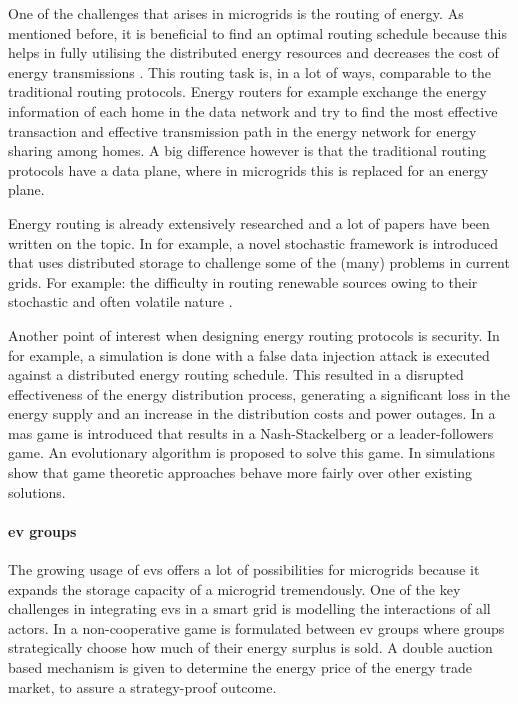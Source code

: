 One of the challenges that arises in microgrids is the routing of energy. As mentioned before, it is beneficial to find an optimal routing schedule because this helps in fully utilising the distributed energy resources and decreases the cost of energy transmissions \cite{HongKim2016}. This routing task is, in a lot of ways, comparable to the traditional routing protocols. Energy routers for example exchange the energy information of each home in the data network and try to find the most effective transaction and effective transmission path in the energy network for energy sharing among homes\cite{YoonKimChang2013}. A big difference however is that the traditional routing protocols have a data plane, where in microgrids this is replaced for an energy plane.

Energy routing is already extensively researched and a lot of papers have been written on the topic. In \cite{BaghaieMoellerKrishnamachari2010} for example, a novel stochastic framework is introduced that uses distributed storage to challenge some of the (many) problems in current grids. For example: the difficulty in routing renewable sources owing to their stochastic and often volatile nature \cite{HongKim2016}. 

Another point of interest when designing energy routing protocols is security. In \cite{LinYuYangEtAl2012} for example, a simulation is done with a false data injection attack is executed against a distributed energy routing schedule. This resulted in a disrupted effectiveness of the energy distribution process, generating a significant loss in the energy supply and an increase in the distribution costs and power outages. In \cite{AhouraiTabandehJahedEtAl2009} a \ac{mas} game is introduced that results in a Nash-Stackelberg or a leader-followers game. An evolutionary algorithm is proposed to solve this game. In \cite{AhouraiTabandehJahedEtAl2009} simulations show that game theoretic approaches behave more fairly over other existing solutions.
\paragraph{\ac{ev} groups}
The growing usage of \ac{ev}s offers a lot of possibilities for microgrids because it expands the storage capacity of a microgrid tremendously. One of the key challenges in integrating \ac{ev}s in a smart grid is modelling the interactions of all actors. In \cite{SaadHanPoorEtAl2011} a non-cooperative game is formulated between \ac{ev} groups where groups strategically choose how much of their energy surplus is sold. A double auction based mechanism is given to determine the energy price of the energy trade market, to assure a strategy-proof outcome. 